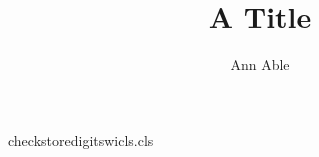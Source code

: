 \begin{filecontents*}[force]{checkstoredigitswicls.cls}
\newcount\aucount
\def\author#1{\advance\aucount by 1 \gdef\@author{#1}}
\def\address#1{\gdef\auaddr{#1}}\def\zip#1{\gdef\auzip{#1}}
\renewcommand\maketitle{\par{\@title\par}\ifnum\aucount>0 {\@author\par}{\auaddr\par\auzip\par}\fi}
\end{filecontents*}
\documentclass{checkstoredigitswicls}
\title{A Title}\author{Ann Able}
\address{Gravel Road 01886}
\maketitle
Body text.

